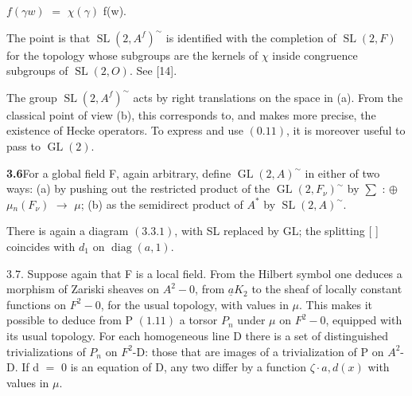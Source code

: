 \documentclass[10pt,a4paper]{article}
\begin{document}
\clearpage
{}
\label{d035-physical-017}
\par\smallskip\begin{center}\begin{minipage}{0.96\textwidth}\centering
$f(\gamma{}w)$ $=$ $\chi{}(\gamma{})$ f(w).
\end{minipage}\end{center}\smallskip
\par The point is that $\operatorname{SL}(2,A^f)^\sim$ is identified with the completion of $\operatorname{SL}(2,F)$ for the topology whose subgroups are the kernels of $\chi{}$ inside congruence subgroups of $\operatorname{SL}(2,O)$. See [14].\par
\par The group $\operatorname{SL}(2,A^f)^\sim$ acts by right translations on the space in (a). From the classical point of view (b), this corresponds to, and makes more precise, the existence of Hecke operators. To express and use $(0.11)$, it is moreover useful to pass to $\operatorname{GL}(2)$.\par
\par\noindent\textbf{3.6}\quad For a global field F, again arbitrary, define $\operatorname{GL}(2,A)^\sim$ in either of two ways: (a) by pushing out the restricted product of the $\operatorname{GL}(2,F_\nu{})^\sim$ by $\sum{}$ : $\oplus{}$ $\mu{}_n(F_\nu{})$ $\to{}$ $\mu{}$; (b) as the semidirect product of $A^*$ by $\operatorname{SL}(2,A)^\sim$.\par
\par There is again a diagram $(3.3.1)$, with SL replaced by GL; the splitting [ ] coincides with $d_1$ on $\operatorname{diag}(a,1)$.\par
\par $3.7$. Suppose again that F is a local field. From the Hilbert symbol one deduces a morphism of Zariski sheaves on $A^2-{0}$, from $\underline{a}K_2$ to the sheaf of locally constant functions on $F^2-{0}$, for the usual topology, with values in $\mu{}$. This makes it possible to deduce from P $(1.11)$ a torsor $P_n$ under $\mu{}$ on $F^2-{0}$, equipped with its usual topology. For each homogeneous line D there is a set of distinguished trivializations of $P_n$ on $F^2$-D: those that are images of a trivialization of P on $A^2$-D. If d $=$ 0 is an equation of D, any two differ by a function $\zeta{}\cdot{}{a,d(x)}$ with values in $\mu{}$.\par
\end{document}
